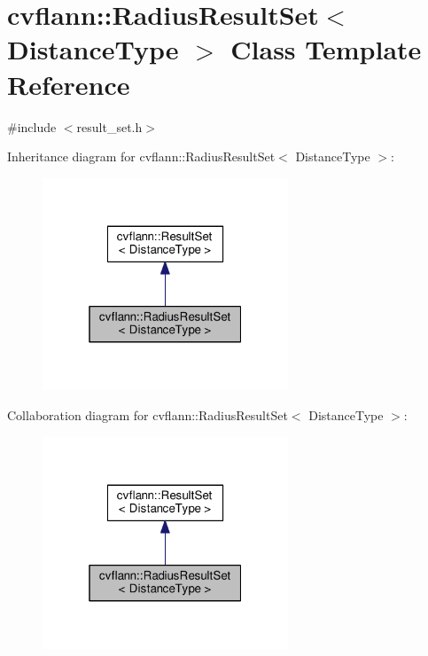\hypertarget{classcvflann_1_1RadiusResultSet}{\section{cvflann\-:\-:Radius\-Result\-Set$<$ Distance\-Type $>$ Class Template Reference}
\label{classcvflann_1_1RadiusResultSet}
}


{\ttfamily \#include $<$result\-\_\-set.\-h$>$}



Inheritance diagram for cvflann\-:\-:Radius\-Result\-Set$<$ Distance\-Type $>$\-:\nopagebreak
\begin{figure}[H]
\begin{center}
\leavevmode
\includegraphics[width=208pt]{classcvflann_1_1RadiusResultSet__inherit__graph}
\end{center}
\end{figure}


Collaboration diagram for cvflann\-:\-:Radius\-Result\-Set$<$ Distance\-Type $>$\-:\nopagebreak
\begin{figure}[H]
\begin{center}
\leavevmode
\includegraphics[width=208pt]{classcvflann_1_1RadiusResultSet__coll__graph}
\end{center}
\end{figure}
